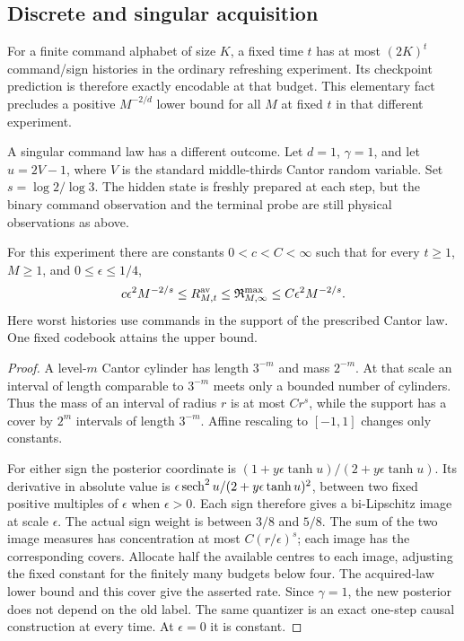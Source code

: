 \subsection{Discrete and singular acquisition}
For a finite command alphabet of size $K$, a fixed time $t$ has at most
$(2K)^t$ command/sign histories in the ordinary refreshing experiment.
Its checkpoint prediction is therefore exactly encodable at that budget.
This elementary fact precludes a positive $M^{-2/d}$ lower bound for all
$M$ at fixed $t$ in that different experiment.

A singular command law has a different outcome. Let $d=1$, $\gamma=1$,
and let $u=2V-1$, where $V$ is the standard middle-thirds Cantor random
variable. Set $s=\log2/\log3$. The hidden state is freshly prepared at
each step, but the binary command observation and the terminal probe are
still physical observations as above.

\begin{proposition}\label{prop:v2-cantor}
For this experiment there are constants $0<c<C<\infty$ such that
for every $t\ge1$, $M\ge1$, and $0\le\epsilon\le1/4$,
\[
 c\epsilon^2M^{-2/s}\le R_{M,t}^{\rm av}
 \le\mathfrak R_{M,\infty}^{\rm max}
 \le C\epsilon^2M^{-2/s}.
\]
Here worst histories use commands in the support of the prescribed Cantor
law. One fixed codebook attains the upper bound.
\end{proposition}
\begin{proof}
A level-$m$ Cantor cylinder has length $3^{-m}$ and mass $2^{-m}$.
At that scale an interval of length comparable to $3^{-m}$ meets only
a bounded number of cylinders. Thus the mass of an interval of radius
$r$ is at most $C r^s$, while the support has a cover by $2^m$ intervals
of length $3^{-m}$. Affine rescaling to $[-1,1]$ changes only constants.

For either sign the posterior coordinate is
$(1+y\epsilon\tanh u)/(2+y\epsilon\tanh u)$.
Its derivative in absolute value is
$\epsilon\operatorname{sech}^2u/(2+y\epsilon\tanh u)^2$, between two fixed positive
multiples of $\epsilon$ when $\epsilon>0$. Each sign therefore gives a
bi-Lipschitz image at scale $\epsilon$. The actual sign weight is between
$3/8$ and $5/8$. The sum of the two image measures has concentration at
most $C(r/\epsilon)^s$; each image has the corresponding covers. Allocate
half the available centres to each image, adjusting the fixed constant
for the finitely many budgets below four. The acquired-law lower bound
and this cover give the asserted rate. Since $\gamma=1$, the new
posterior does not depend on the old label. The same quantizer is an exact
one-step causal construction at every time. At $\epsilon=0$ it is constant.
\end{proof}

